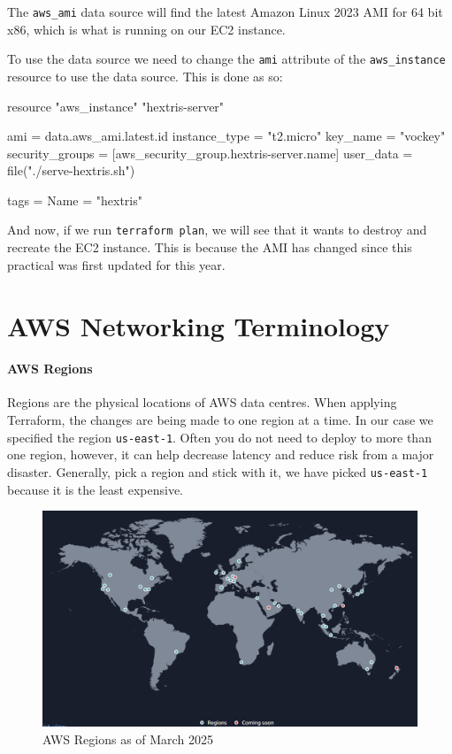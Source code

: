 \documentclass{csse4400}
\begin{document}
The \texttt{aws\_ami} data source will find the latest Amazon Linux 2023 AMI for 64 bit x86, which is what is running on our EC2 instance.

To use the data source we need to change the \texttt{ami} attribute of the \texttt{aws\_instance} resource to use the data source. This is done as so:

\begin{code}[language=terraform,numbers=none]{}
resource "aws_instance" "hextris-server" {
  ami           = data.aws_ami.latest.id
  instance_type = "t2.micro"
  key_name      = "vockey"
  security_groups = [aws_security_group.hextris-server.name]
  user_data = file("./serve-hextris.sh")

  tags = {
    Name = "hextris"
  }
}
\end{code}

And now, if we run \texttt{terraform plan}, we will see that it wants to destroy and recreate the EC2 instance.
This is because the AMI has changed since this practical was first updated for this year.






\appendix

\section{AWS Networking Terminology}
\paragraph{AWS Regions}
Regions are the physical locations of AWS data centres.
When applying Terraform, the changes are being made to one region at a time.
In our case we specified the region \texttt{us-east-1}.
Often you do not need to deploy to more than one region, however,
it can help decrease latency and reduce risk from a major disaster.
Generally, pick a region and stick with it,
we have picked \texttt{us-east-1} because it is the least expensive.

\begin{figure}[ht]
\includegraphics[width=\textwidth]{images/aws_regions}
\caption{AWS Regions as of March 2025 \cite{aws-regions}}
\end{figure}
\end{document}
